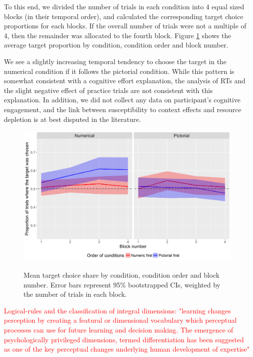 \documentclass[11pt,a4paper]{article}
\begin{document}
To this end, we divided the number of trials in each condition into 4 equal sized blocks (in their temporal order), and calculated the corresponding target choice proportions for each blocks. If the overall number of trials were not a multiple of 4, then the remainder was allocated to the fourth block. Figure \ref{fig:Block_order} shows the average target proportion by condition, condition order and block number.

We see a slightly increasing temporal tendency to choose the target in the numerical condition if it follows the pictorial condition. While this pattern is somewhat consistent with a cognitive effort explanation, the analysis of RTs and the slight negative effect of practice trials are not consistent with this explanation. In addition, we did not collect any data on participant's cognitive engagement, and the link between susceptibility to context effects and resource depletion is at best disputed in the literature. 


\begin{figure}
\centering
\caption{Mean target choice share by condition, condition order and block number. Error bars represent 95\% bootstrapped CIs, weighted by the number of trials in each block.}
\includegraphics[width=1\textwidth]{Block_order.png}
\label{fig:Block_order}
\end{figure}

\textcolor{red}{Logical-rules and the classification of integral dimensions: "learning changes perception by creating a featural or dimensional vocabulary which perceptual processes can use for future learning and decision making. The emergence of psychologically privileged dimensions, termed differentiation has been suggested as one of the key perceptual changes underlying human development of expertise"}
\end{document}
